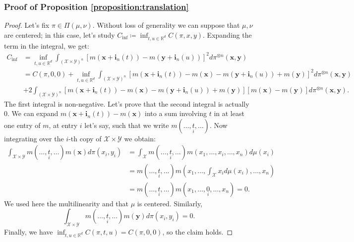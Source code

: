 \documentclass{article}
\newcommand{\R}{\mathbb{R}}
\newcommand{\Y}{\mathcal{Y}}
\newcommand{\X}{\mathcal{X}}
\newcommand{\1}{\mathbf{1}}
\theoremstyle{definition}
\theoremstyle{remark}
\begin{document}
\begin{appendices}
\subsubsection*{Proof of Proposition \ref{proposition:translation}}
\begin{proof}
    Let's fix $\pi\in\Pi(\mu,\nu)$. Without loss of generality we can suppose that $\mu,\nu$ are centered; in this case, let's study $C_{\inf}\coloneqq\inf_{t,u\in\R^d}C(\pi,x,y)$. Expanding the term in the integral, we get:
     \begin{equation*}
        \begin{split}
            C_{\inf}&= \inf_{t,u\in\R^d}\int_{(\X\times\Y)^n}[m(\mathbf{x}+\mathbf{i}_n(t))-m(\mathbf{y}+\mathbf{i}_n(u))]^2d\pi^{\otimes n}(\mathbf{x},\mathbf{y})\\
            &=  C(\pi,0,0)+\inf_{t,u\in\R^d}\int_{(\X\times\Y)^n}[m(\mathbf{x}+\mathbf{i}_n(t))-m(\mathbf{x})-m(\mathbf{y}+\mathbf{i}_n(u))+m(\mathbf{y})]^2d\pi^{\otimes n}(\mathbf{x},\mathbf{y})\\
            &+2\int_{(\X\times\Y)^n}[m(\mathbf{x}+\mathbf{i}_n(t))-m(\mathbf{x})-m(\mathbf{y}+\mathbf{i}_n(u))+m(\mathbf{y})][m(\mathbf{x})-m(\mathbf{y})]d\pi^{\otimes n}(\mathbf{x},\mathbf{y}).
        \end{split}
    \end{equation*}
    The first integral is non-negative. Let's prove that the second integral is actually 0. We can expand $m(\mathbf{x}+\mathbf{i}_n(t))-m(\mathbf{x})$ into a sum involving $t$ in at least one entry of $m$, at entry $i$ let's say, such that we write $m(\dots,\underset{i}{t},\dots)$. Now integrating over the $i$-th copy of $\X\times\Y$ we obtain:
    \begin{equation*}
       \begin{split}
            \int_{\X\times\Y}m(\dots,\underset{i}{t},\dots)m(\mathbf{x})d\pi(x_i,y_i)
            &=\int_{\X}m(\dots,\underset{i}{t},\dots)m(x_1,\dots,x_i,\dots,x_n)d\mu(x_i)\\
            &=m(\dots,\underset{i}{t},\dots)m(x_1,\dots,\int_{\X}x_id\mu(x_i),\dots,x_n)\\
            &=m(\dots,\underset{i}{t},\dots)m(x_1,\dots,\underset{i}{0},\dots,x_n) = 0.
       \end{split}
    \end{equation*}
    We used here the multilinearity and that  $\mu$ is centered. Similarly, \[\int_{\X\times\Y}m(\dots,\underset{i}{t},\dots)m(\mathbf{y})d\pi(x_i,y_i)=0.\]
    Finally, we have $\inf_{t,u\in\R^d}C(\pi,t,u)= C(\pi,0,0)$, so the claim holds.
\end{proof}


\end{appendices}
\end{document}
